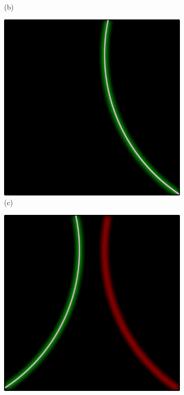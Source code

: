 \begin{figure}[ht]
\begin{subfigure}{.24\textwidth}
        \caption*{(b)}
    \end{subfigure}
    \begin{subfigure}{.24\textwidth}
        \centering
        \includegraphics[scale=.065]{figures/Coaxing/SingleLine1.png}
        \caption*{(c)}
    \end{subfigure}
    \begin{subfigure}{.24\textwidth}
        \centering
        \includegraphics[scale=.065]{figures/Coaxing/SingleLine2.png}

\end{subfigure}
\end{figure}
